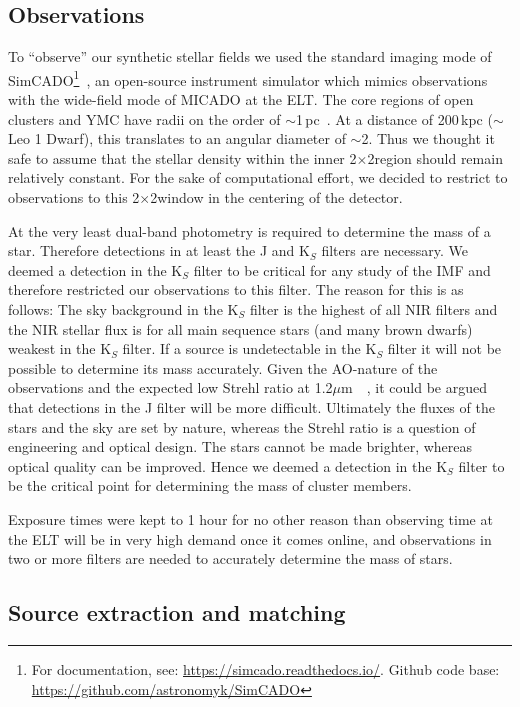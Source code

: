 \documentclass[referee]{aa}
\newcommand{\um}{$\mu$m~}
\newcommand{\s}{$\sim$}
\begin{document}
\subsection{Observations}
\label{sec:telescope}

To ``observe'' our synthetic stellar fields we used the standard imaging mode of SimCADO\footnote{For documentation, see: \url{https://simcado.readthedocs.io/}.
Github code base: \url{https://github.com/astronomyk/SimCADO}}~\citep{leschinski2016}, an open-source instrument simulator which mimics observations with the wide-field mode of MICADO at the ELT\@.
The core regions of open clusters and YMC have radii on the order of \s1\,pc~\citep{portegies2010}.
At a distance of 200\,kpc ($\sim$Leo 1 Dwarf), this translates to an angular diameter of \s2\arcsec.
Thus we thought it safe to assume that the stellar density within the inner 2\arcsec$\times$2\arcsec region should remain relatively constant.
For the sake of computational effort, we decided to restrict to observations to this 2\arcsec$\times$2\arcsec window in the centering of the detector.

At the very least dual-band photometry is required to determine the mass of a star.
Therefore detections in at least the J and K$_S$ filters are necessary.
We deemed a detection in the K$_S$ filter to be critical for any study of the IMF and therefore restricted our observations to this filter.
The reason for this is as follows: The sky background in the K$_S$ filter is the highest of all NIR filters and the NIR stellar flux is for all main sequence stars (and many brown dwarfs) weakest in the K$_S$ filter.
If a source is undetectable in the K$_S$ filter it will not be possible to determine its mass accurately.
Given the AO-nature of the observations and the expected low Strehl ratio at 1.2\um~\citep{clenet2016}, it could be argued that detections in the J filter will be more difficult.
Ultimately the fluxes of the stars and the sky are set by nature, whereas the Strehl ratio is a question of engineering and optical design.
The stars cannot be made brighter, whereas optical quality can be improved.
Hence we deemed a detection in the K$_S$ filter to be the critical point for determining the mass of cluster members.

Exposure times were kept to 1 hour for no other reason than observing time at the ELT will be in very high demand once it comes online, and observations in two or more filters are needed to accurately determine the mass of stars.


\subsection{Source extraction and matching}
\label{subsec:source_extraction}
\end{document}
